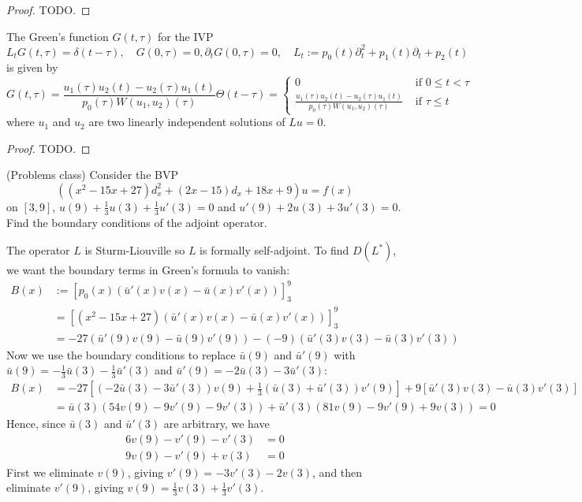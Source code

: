 \begin{proof}
	TODO.
\end{proof}

\begin{theorem}
	The Green's function $G(t, \tau)$ for the IVP
	\[
		L_t G(t, \tau) = \delta(t - \tau), \quad G(0, \tau) = 0, \partial_t G(0, \tau) = 0, \quad L_t := p_0(t) \partial_t^2 + p_1(t) \partial_t + p_2(t)
	\]
	is given by
	\[
		G(t, \tau) = \frac{u_1(\tau) u_2(t) - u_2(\tau) u_1(t)}{p_0(\tau) W(u_1, u_2) (\tau)} \Theta(t - \tau) = \begin{cases}
			0 & \text{ if } 0 \le t < \tau \\
			\frac{u_1(\tau) u_2(t) - u_2(\tau) u_1(t)}{p_0(\tau) W(u_1, u_2) (\tau)} & \text{ if } \tau \le t
		\end{cases}
	\]
	where $u_1$ and $u_2$ are two linearly independent solutions of $Lu = 0$.
\end{theorem}

\begin{proof}
	TODO.
\end{proof}

\begin{example}
	(Problems class) Consider the BVP
	\[
		((x^2 - 15x + 27) d_x^2 + (2x - 15) d_x + 18x + 9) u = f(x)
	\]
	on $[3, 9]$, $u(9) + \frac{1}{3} u(3) + \frac{1}{3} u'(3) = 0$ and $u'(9) + 2 u(3) + 3u'(3) = 0$. Find the boundary conditions of the adjoint operator.

	The operator $L$ is Sturm-Liouville so $L$ is formally self-adjoint. To find $D(L^*)$, we want the boundary terms in Green's formula to vanish:
	\[
		\begin{aligned}
			B(x) & := [p_0(x) (\bar{u}'(x) v(x) - \bar{u}(x) v'(x))]_3^9 \\
			& = [(x^2 - 15x + 27) (\bar{u}'(x) v(x) - \bar{u}(x) v'(x))]_3^9 \\
			& = -27 (\bar{u}'(9) v(9) - \bar{u}(9) v'(9)) - (-9) (\bar{u}'(3) v(3) - \bar{u}(3) v'(3))
		\end{aligned}
	\]
	Now we use the boundary conditions to replace $\bar{u}(9)$ and $\bar{u}'(9)$ with $\bar{u}(9) = -\frac{1}{3} \bar{u}(3) - \frac{1}{3} \bar{u}'(3)$ and $\bar{u}'(9) = -2 \bar{u}(3) - 3 \bar{u}'(3)$:
	\[
		\begin{aligned}
			B(x) & = -27 [(-2\bar{u}(3) - 3\bar{u}'(3)) v(9) + \frac{1}{3} (\bar{u}(3) + \bar{u}'(3)) v'(9)] + 9 [\bar{u}'(3) v(3) - \bar{u}(3) v'(3)] \\
			& = \bar{u}(3) (54 v(9) - 9v'(9) - 9v'(3)) + \bar{u}'(3) (81 v(9) - 9v'(9) + 9v(3)) = 0
		\end{aligned}
	\]
	Hence, since $\bar{u}(3)$ and $\bar{u}'(3)$ are arbitrary, we have
	\[
		\begin{aligned}
			6v(9) - v'(9) - v'(3) & = 0 \\
			9v(9) - v'(9) + v(3) & = 0
		\end{aligned}
	\]
	First we eliminate $v(9)$, giving $v'(9) = -3v'(3) - 2v(3)$, and then eliminate $v'(9)$, giving $v(9) = \frac{1}{3} v(3) + \frac{1}{3} v'(3)$.
\end{example}

